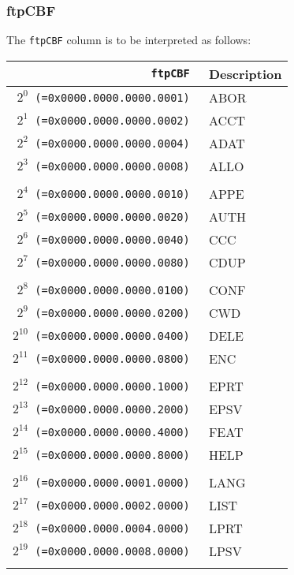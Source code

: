 \documentclass[documentation]{subfiles}
\begin{document}
\subsubsection{ftpCBF}\label{ftpCBF}
The {\tt ftpCBF} column is to be interpreted as follows:\\
\begin{minipage}{.48\textwidth}
    \begin{longtable}{>{\tt}rl}
        \toprule
        {\bf ftpCBF} & {\bf Description} \\
        \midrule\endhead%
        $2^{0}$  (=0x0000.0000.0000.0001) & ABOR\\
        $2^{1}$  (=0x0000.0000.0000.0002) & ACCT\\
        $2^{2}$  (=0x0000.0000.0000.0004) & ADAT\\
        $2^{3}$  (=0x0000.0000.0000.0008) & ALLO\\
        \\
        $2^{4}$  (=0x0000.0000.0000.0010) & APPE\\
        $2^{5}$  (=0x0000.0000.0000.0020) & AUTH\\
        $2^{6}$  (=0x0000.0000.0000.0040) & CCC\\
        $2^{7}$  (=0x0000.0000.0000.0080) & CDUP\\
        \\
        $2^{8}$  (=0x0000.0000.0000.0100) & CONF\\
        $2^{9}$  (=0x0000.0000.0000.0200) & CWD\\
        $2^{10}$ (=0x0000.0000.0000.0400) & DELE\\
        $2^{11}$ (=0x0000.0000.0000.0800) & ENC\\
        \\
        $2^{12}$ (=0x0000.0000.0000.1000) & EPRT\\
        $2^{13}$ (=0x0000.0000.0000.2000) & EPSV\\
        $2^{14}$ (=0x0000.0000.0000.4000) & FEAT\\
        $2^{15}$ (=0x0000.0000.0000.8000) & HELP\\
        \\
        $2^{16}$ (=0x0000.0000.0001.0000) & LANG\\
        $2^{17}$ (=0x0000.0000.0002.0000) & LIST\\
        $2^{18}$ (=0x0000.0000.0004.0000) & LPRT\\
        $2^{19}$ (=0x0000.0000.0008.0000) & LPSV\\
        \\

\end{longtable}
\end{minipage}
\end{document}
